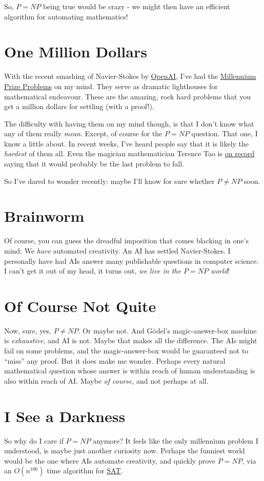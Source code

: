 \documentclass[11pt]{article}
\begin{document}
So, $P = NP$ being true would be crazy - we might then have an efficient algorithm for automating mathematics! 

\section{One Million Dollars}

With the recent smashing of Navier-Stokes by \href{https://openai.com/index/navier-stokes-solution/}{OpenAI}, I've had the
\href{https://www.claymath.org/millennium-problems/}{Millennium Prize Problems} on my mind.
They serve as dramatic lighthouses for mathematical endeavour.
These are the amazing, rock hard problems that you get a million dollars for settling (with a proof!). 

The difficulty with having them on my mind though, is that I don't know what any of them really \textit{mean}. Except,
of course for the $P = NP$ question. That one, I know a little about. In recent weeks, I've heard people
say that it is likely the \textit{hardest} of them all. Even the magician mathematician Terence 
Tao is \href{https://www.youtube.com/watch?v=PtsrAw1LR3E&t=2727s}{on record} saying that it would probably be the last problem to fall.

So I've dared to wonder recently: maybe I'll know for sure whether $P \neq NP$ soon.

\section{Brainworm}

Of course, you can guess the dreadful imposition that comes blacking in one's mind: We \textit{have} automated creativity.
An AI has settled Navier-Stokes. I personally have had AIs answer many publishable questions in computer science. 
I can't get it out of my head, it turns out, \textit{we live in the $P = NP$ world}!

\section{Of Course Not Quite}

Now, sure, yes, $P \neq NP$. Or maybe not. And G\"odel's magic-answer-box machine is \textit{exhaustive}, and AI is not.
Maybe that makes all the difference. The AIs might fail on some problems, and the magic-answer-box would be guaranteed not to ``miss'' any proof. 
But it does make me wonder. Perhaps every natural mathematical question whose answer is within reach of human understanding is also within reach of AI.
Maybe \textit{of course}, and not perhaps at all. 

\section{I See a Darkness}

So why do I care if $P = NP$ anymore? It feels like the only millennium problem I understood, is maybe just another 
curiosity now. Perhaps the funniest world would
be the one where AIs automate creativity, and quickly prove $P = NP$, via an $O(n^{100})$ time algorithm for \href{https://en.wikipedia.org/wiki/Boolean_satisfiability_problem}{SAT}.
\end{document}
